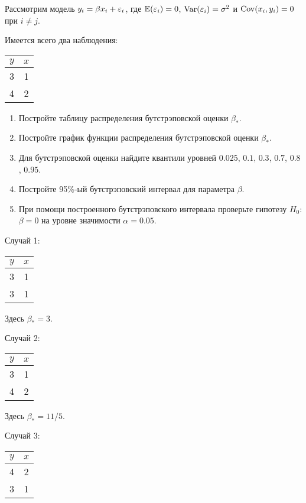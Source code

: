 \begin{problem}
Рассмотрим модель $y_i = \beta x_i + \varepsilon_i$, где $\mathbb{E}(\varepsilon_i)=0$, $\operatorname{Var}(\varepsilon_i)=\sigma^2$ и $\operatorname{Cov}(x_i, y_i)=0$ при $i \neq j$.

Имеется всего два наблюдения:

\begin{tabular}{cc}
\toprule
$y$ & $x$ \\
\midrule
 3 & 1 \\
 4 & 2 \\
\bottomrule
\end{tabular}

\begin{enumerate}
\item Постройте таблицу распределения бутстрэповской оценки $\beta_*$.
\item Постройте график функции распределения бутстрэповской оценки $\beta_*$.
\item Для бутстрэповской оценки найдите квантили уровней $0.025$, $0.1$, $0.3$, $0.7$, $0.8$, $0.95$.
\item Постройте 95\%-ый бутстрэповский интервал для параметра $\beta$.
\item При помощи построенного бутстрэповского интервала проверьте гипотезу $H_0$: $\beta = 0$ на уровне значимости $\alpha = 0.05$.
\end{enumerate}

\begin{sol}
Случай 1:

\begin{tabular}{cc}
\toprule
$y$ & $x$ \\
\midrule
 3 & 1 \\
 3 & 1 \\
\bottomrule
\end{tabular}

Здесь $\beta_* = 3$.

Случай 2:

\begin{tabular}{cc}
\toprule
$y$ & $x$ \\
\midrule
 3 & 1 \\
 4 & 2 \\
\bottomrule
\end{tabular}

Здесь $\beta_* = 11/5$.

Случай 3:

\begin{tabular}{cc}
\toprule
$y$ & $x$ \\
\midrule
 4 & 2 \\
 3 & 1 \\
\bottomrule
\end{tabular}


\end{sol}
\end{problem}

